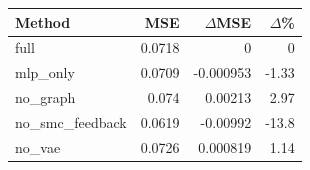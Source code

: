 \begin{tabular}{lrrr}
\toprule
Method & MSE & $\Delta$MSE & $\Delta$\% \\
\midrule
full & 0.0718 & 0 & 0 \\
mlp\_only & 0.0709 & -0.000953 & -1.33 \\
no\_graph & 0.074 & 0.00213 & 2.97 \\
no\_smc\_feedback & 0.0619 & -0.00992 & -13.8 \\
no\_vae & 0.0726 & 0.000819 & 1.14 \\
\bottomrule
\end{tabular}
